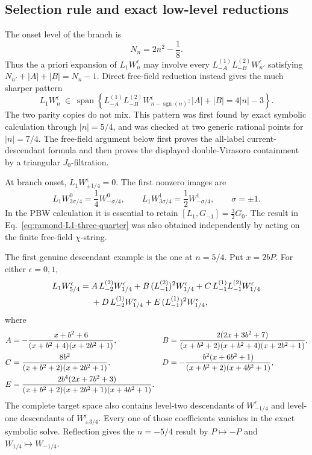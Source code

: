 \documentclass[11pt]{article}
\begin{document}
\subsection{Selection rule and exact low-level reductions}

The onset level of the branch is
\begin{equation}
 N_n=2n^2-\frac18.
\end{equation}
Thus the a priori expansion of \(L_1W_n^\epsilon\) may involve every
\(L_{-A}^{(1)}L_{-B}^{(2)}W_{n'}^\epsilon\) satisfying
\(N_{n'}+|A|+|B|=N_n-1\).  Direct free-field reduction instead gives the
much sharper pattern
\begin{equation}
 \boxed{
 L_1W_n^\epsilon\ \in\
 \operatorname{span}\left\{
 L_{-A}^{(1)}L_{-B}^{(2)}W_{n-\operatorname{sgn}(n)}^\epsilon:
 |A|+|B|=4|n|-3
 \right\}.}
 \label{eq:ramond-L1-selection}
\end{equation}
The two parity copies do not mix.  This pattern was first found by exact
symbolic calculation through \(|n|=5/4\), and was checked at two generic
rational points for \(|n|=7/4\).  The free-field argument below first proves
the all-label current-descendant formula and then proves the displayed
double-Virasoro containment by a triangular \(J_0\)-filtration.

At branch onset, \(L_1W_{\pm1/4}^\epsilon=0\).  The first nonzero images are
\begin{equation}
 L_1W_{3\sigma/4}^{0}=\frac14W_{-\sigma/4}^{0},
 \qquad
 L_1W_{3\sigma/4}^{1}=\frac12W_{-\sigma/4}^{1},
 \qquad \sigma=\pm1.
 \label{eq:ramond-L1-three-quarter}
\end{equation}
In the PBW calculation it is essential to retain
\([L_1,G_{-1}]=\frac32G_0\).  The result in
Eq.~\eqref{eq:ramond-L1-three-quarter} was also obtained independently by
acting on the finite free-field \(\chi\)-string.

The first genuine descendant example is the one at \(n=5/4\).  Put
\(x=2bP\).  For either \(\epsilon=0,1\),
\begin{align}
 L_1W_{5/4}^{\epsilon}
 ={}&A\,L_{-2}^{(2)}W_{1/4}^{\epsilon}
 +B\,(L_{-1}^{(2)})^2W_{1/4}^{\epsilon}
 +C\,L_{-1}^{(1)}L_{-1}^{(2)}W_{1/4}^{\epsilon}
 \notag\\
 &+D\,L_{-2}^{(1)}W_{1/4}^{\epsilon}
 +E\,(L_{-1}^{(1)})^2W_{1/4}^{\epsilon},
 \label{eq:ramond-L1-five-quarter}
\end{align}
where
\begin{align}
 A&=-\frac{x+b^2+6}{(x+b^2+4)(x+2b^2+1)},
 &
 B&=\frac{2(2x+3b^2+7)}
 {(x+b^2+2)(x+b^2+4)(x+2b^2+1)},
 \notag\\
 C&=\frac{8b^2}{(x+b^2+2)(x+2b^2+1)},
 &
 D&=-\frac{b^2(x+6b^2+1)}
 {(x+b^2+2)(x+4b^2+1)},
 \notag\\
 E&=\frac{2b^4(2x+7b^2+3)}
 {(x+b^2+2)(x+2b^2+1)(x+4b^2+1)}.
 \label{eq:ramond-L1-five-quarter-coefficients}
\end{align}
The complete target space also contains level-two descendants of
\(W_{-1/4}^{\epsilon}\) and level-one descendants of
\(W_{\pm3/4}^{\epsilon}\).  Every one of those coefficients vanishes in the
exact symbolic solve.  Reflection gives the \(n=-5/4\) result by
\(P\mapsto-P\) and \(W_{1/4}\mapsto W_{-1/4}\).
\end{document}
